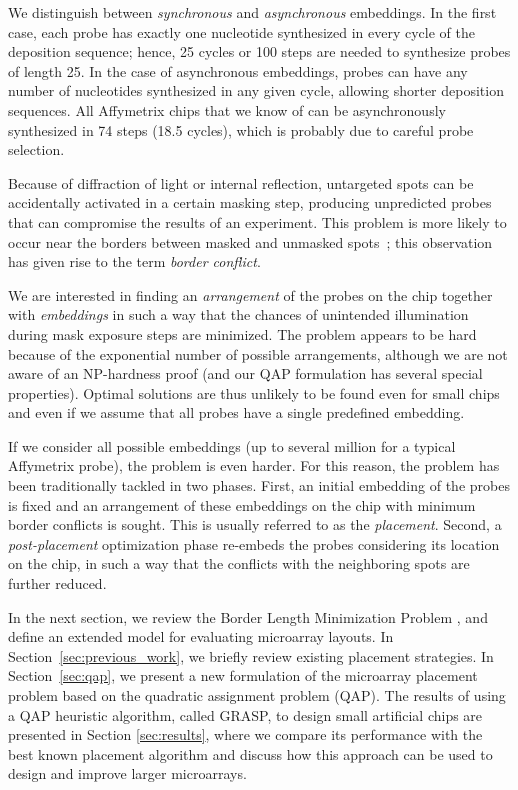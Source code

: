\documentclass[english]{lni}
\begin{document}
We distinguish between \emph{synchronous} and \emph{asynchronous} embeddings.
In the first case, each probe has exactly one nucleotide synthesized in every
cycle of the deposition sequence; hence, 25 cycles or 100 steps are needed to
synthesize probes of length 25. In the case of asynchronous embeddings,
probes can have any number of nucleotides synthesized in any given cycle,
allowing shorter deposition sequences. All Affymetrix chips that we know of
can be asynchronously synthesized in 74 steps (18.5 cycles), which is probably
due to careful probe selection.

Because of diffraction of light or internal reflection, untargeted spots can
be accidentally activated in a certain masking step, producing
unpredicted probes that can compromise the results of an experiment. This
problem is more likely to occur near the borders between masked and unmasked
spots~\cite{FODOR91}; this observation has given rise to the term
\emph{border conflict}.

We are interested in finding an \emph{arrangement} of the probes on the chip
together with \emph{embeddings} in such a way that the chances of unintended
illumination during mask exposure steps are minimized. The problem appears to
be hard because of the exponential number of possible arrangements, although
we are not aware of an NP-hardness proof (and our QAP formulation has several
special properties). Optimal solutions are thus unlikely to be found even
for small chips and even if we assume that all probes have a single predefined
embedding.

If we consider all possible embeddings (up to several million for a
typical Affymetrix probe), the problem is even harder.
For this reason, the problem has been traditionally tackled in two phases.
First, an initial embedding of the probes is fixed and an arrangement of these
embeddings on the chip with minimum border conflicts is sought. This is
usually referred to as the \emph{placement}. Second, a \emph{post-placement}
optimization phase re-embeds the probes considering its location on the chip,
in such a way that the conflicts with the neighboring spots are further
reduced.

In the next section, we review the Border Length Minimization Problem
\cite{HANNENHALLI02}, and define an extended model for evaluating microarray
layouts. In Section~\ref{sec:previous_work}, we briefly review existing
placement strategies. In Section~\ref{sec:qap}, we present a new formulation
of the microarray placement problem based on the quadratic assignment problem (QAP). The
results of using a QAP heuristic algorithm, called GRASP, to design small
artificial chips are presented in Section \ref{sec:results}, where we
compare its performance with the best known placement algorithm and
discuss how this approach can be used to design and improve larger microarrays.
\end{document}
